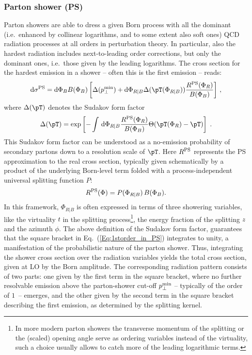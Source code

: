 \subsubsection{Parton shower (PS)}
Parton showers are able to dress a given Born process with all the dominant
(i.e.\ enhanced by collinear logarithms, and to some extent also soft ones)
QCD radiation processes at all orders in perturbation theory.
In particular, also the hardest radiation includes next-to-leading order
corrections, but only the dominant ones, i.e.\ those
given by the leading logarithms.
The cross section for the hardest emission in a shower -- often this is the 
first emission -- reads:
\begin{equation}
\label{Eq:1storder_in_PS}
{\rm d}\sigma^{\rm PS} = 
{\rm d}\Phi_B B(\Phi_B)
\left[\Delta(\pperpmin) + 
      {\rm d}\Phi_{R|B} \Delta(\pT(\Phi_{R|B}))
\frac{R^{\rm PS}(\Phi_R)}{B(\Phi_B)}   \right]\,,
\end{equation}
where $\Delta(\pT)$ denotes the Sudakov form factor
\begin{equation}
\Delta(\pT) = 
\exp\left[-\int\,{\rm d}\Phi_{R|B}\frac{R^{\rm PS}(\Phi_R)}{B(\Phi_B)} 
\Theta(\pT(\Phi_{R})-\pT)\right]\;.
\end{equation}
This Sudakov form factor can be understood as a no-emission probability
of secondary partons down to a resolution scale of $\pT$.
Here $R^{\rm PS}$ represents the PS approximation to the real cross section,
typically given schematically by a product of the underlying Born-level
term folded with a process-independent universal splitting function $P$:
\begin{equation}
R^{\rm PS}(\Phi)=P(\Phi_{R|B})\,B(\Phi_B).
\end{equation}
In this framework, $\Phi_{R|B}$ is often expressed in terms of three showering 
variables, like the virtuality $t$ in the splitting process\footnote{
           In more modern parton showers the transverse momentum
           of the splitting or the (scaled) opening angle serve
           as ordering variables instead of the virtuality, such
           a choice usually allows to catch more of the leading
           logarithmic terms.
}, the energy fraction of the splitting $z$ and the azimuth $\phi$.
The above definition of the Sudakov form factor, guarantees
that the square bracket in Eq.\ (\ref{Eq:1storder_in_PS}) integrates to unity,
a manifestation of the probabilistic nature of the parton shower.
Thus, integrating the shower cross section over the radiation variables
yields the total cross section, given at LO by the Born amplitude.
The corresponding radiation pattern consists of two parts: one 
given by the first term in the square bracket, where no further resolvable 
emission above the parton-shower cut-off $p_\perp^{\rm min}$ -- typically of the order
of $1$\UGeV\ -- emerges, and the other given by the second term in the square bracket describing the first emission, as determined by the splitting kernel.

